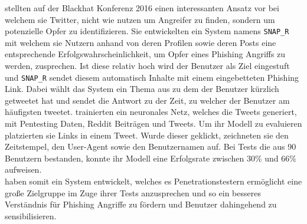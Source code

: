 \documentclass[
    12pt, %
    DIV10,
    ngerman, %
    a4paper, %
    oneside, %
    titlepage, %
    parskip=half, %
    headings=normal, %
    listof=totoc, %
    bibliography=totoc, %
    index=totoc, %
    captions=tableheading, %
    final %
]{scrreprt}
\begin{document}
\textcite{Seymour} stellten auf der Blackhat Konferenz 2016 einen interessanten Ansatz vor bei welchem sie Twitter, nicht wie \textcite{Javed2019} nutzen um Angreifer zu finden, sondern um potenzielle Opfer zu identifizieren. Sie entwickelten ein System namens \texttt{SNAP\_R} mit welchem sie Nutzern anhand von deren Profilen sowie deren Posts eine entsprechende Erfolgswahrscheinlichkeit, um Opfer eines Phishing Angriffs zu werden, zusprechen. Ist diese relativ hoch wird der Benutzer als Ziel eingestuft und \texttt{SNAP\_R} sendet diesem automatisch Inhalte mit einem eingebetteten Phishing Link. Dabei wählt das System ein Thema aus zu dem der Benutzer kürzlich getweetet hat und sendet die Antwort zu der Zeit, zu welcher der Benutzer am häufigsten tweetet. \textcite{Seymour} trainierten ein neuronales Netz, welches die Tweets generiert, mit Pentesting Daten, Reddit Beiträgen und Tweets. Um ihr Modell zu evaluieren platzierten sie Links in einem Tweet. Wurde dieser geklickt, zeichneten sie den Zeitstempel, den User-Agent sowie den Benutzernamen auf. Bei Tests die aus 90 Benutzern bestanden, konnte ihr Modell eine Erfolgsrate zwischen 30\% und 66\% aufweisen.\\
\textcite{Seymour} haben somit ein System entwickelt, welches es Penetrationstestern ermöglicht eine gro{\ss}e Zielgruppe im Zuge
ihrer Tests anzusprechen und so ein besseres Verständnis für Phishing Angriffe zu fördern und Benutzer dahingehend zu sensibilisieren.
\end{document}
